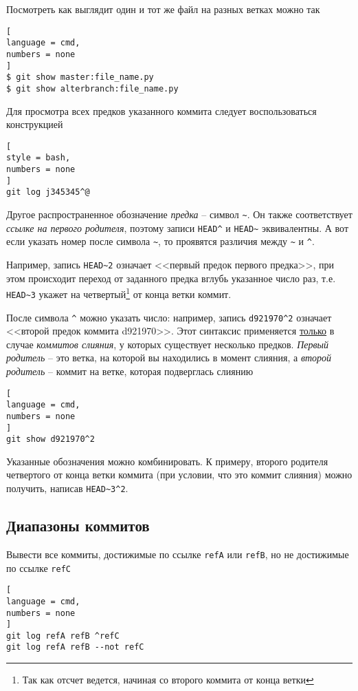 \documentclass[%
	11pt,
	a4paper,
	utf8,
		]{article}
\begin{document}
Посмотреть как выглядит один и тот же файл на разных ветках можно так
\begin{lstlisting}[
language = cmd,
numbers = none
]
$ git show master:file_name.py
$ git show alterbranch:file_name.py
\end{lstlisting}

Для просмотра всех предков указанного коммита следует воспользоваться конструкцией
\begin{lstlisting}[
style = bash,
numbers = none
]
git log j345345^@
\end{lstlisting}


Другое распространенное обозначение \emph{предка} -- символ \lstinline{~}. Он также соответствует \emph{ссылке на первого родителя}, поэтому записи \lstinline{HEAD^} и \lstinline{HEAD~} эквивалентны. А вот если указать номер после символа \lstinline{~}, то проявятся различия между \lstinline{~} и \lstinline{^}.

Например, запись \lstinline{HEAD~2} означает <<первый предок первого предка>>, при этом происходит переход от заданного предка вглубь указанное число раз, т.е. \lstinline{HEAD~3} укажет на четвертый\footnote{Так как отсчет ведется, начиная со второго коммита от конца ветки} от конца ветки коммит.

После символа \lstinline{^} можно указать число: например, запись \lstinline{d921970^2} означает <<второй предок коммита d921970>>. Этот синтаксис применяется \underline{только} в случае \emph{коммитов слияния}, у которых существует несколько предков. \emph{Первый родитель} -- это ветка, на которой вы находились в момент слияния, а \emph{второй родитель} -- коммит на ветке, которая подверглась слиянию

\begin{lstlisting}[
language = cmd,
numbers = none
]
git show d921970^2
\end{lstlisting}

Указанные обозначения можно комбинировать. К примеру, второго родителя четвертого от конца ветки коммита (при условии, что это коммит слияния) можно получить, написав \lstinline{HEAD~3^2}.

\subsection{Диапазоны коммитов}

Вывести все коммиты, достижимые по ссылке \texttt{refA} или \texttt{refB}, но не достижимые по ссылке \texttt{refC}

\begin{lstlisting}[
language = cmd,
numbers = none
]
git log refA refB ^refC
git log refA refB --not refC
\end{lstlisting}
\end{document}
